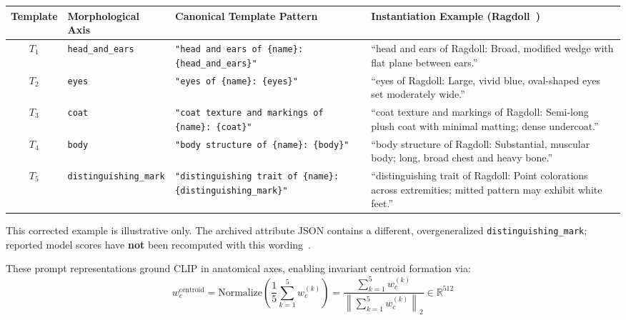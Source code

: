 \documentclass[conference]{IEEEtran}
\begin{document}
\vspace{5pt}
\noindent\begingroup\small\setlength{\tabcolsep}{4pt}%
\renewcommand{\arraystretch}{1.35}%
\begin{tabularx}{\textwidth}{@{} c l p{5.8cm} X @{}}
\toprule
\textbf{Template} & \textbf{Morphological Axis} & \textbf{Canonical Template Pattern} & \textbf{Instantiation Example (Ragdoll~\cite{cfa_ragdoll})} \\
\midrule
\boldmath $T_1$ & \texttt{head\_and\_ears} & \texttt{"head and ears of \{name\}: \{head\_and\_ears\}"} & ``head and ears of Ragdoll: Broad, modified wedge with flat plane between ears.'' \\
\boldmath $T_2$ & \texttt{eyes} & \texttt{"eyes of \{name\}: \{eyes\}"} & ``eyes of Ragdoll: Large, vivid blue, oval-shaped eyes set moderately wide.'' \\
\boldmath $T_3$ & \texttt{coat} & \texttt{"coat texture and markings of \{name\}: \{coat\}"} & ``coat texture and markings of Ragdoll: Semi-long plush coat with minimal matting; dense undercoat.'' \\
\boldmath $T_4$ & \texttt{body} & \texttt{"body structure of \{name\}: \{body\}"} & ``body structure of Ragdoll: Substantial, muscular body; long, broad chest and heavy bone.'' \\
\boldmath $T_5$ & \texttt{distinguishing\_mark} & \texttt{"distinguishing trait of \{name\}: \{distinguishing\_mark\}"} & ``distinguishing trait of Ragdoll: Point colorations across extremities; mitted pattern may exhibit white feet.'' \\
\bottomrule
\end{tabularx}\endgroup
\vspace{5pt}

\noindent This corrected example is illustrative only. The archived attribute JSON contains a different, overgeneralized \texttt{distinguishing\_mark}; reported model scores have \textbf{not} been recomputed with this wording~\cite{cfa_ragdoll}.

\vspace{5pt}
\noindent These prompt representations ground CLIP in anatomical axes, enabling invariant centroid formation via:
\[
w_c^{\text{centroid}} = \text{Normalize}\left(\frac{1}{5}\sum_{k=1}^{5} w_c^{(k)}\right) = \frac{\sum_{k=1}^{5} w_c^{(k)}}{\left\|\sum_{k=1}^{5} w_c^{(k)}\right\|_2} \in \mathbb{R}^{512}
\]
\end{document}
